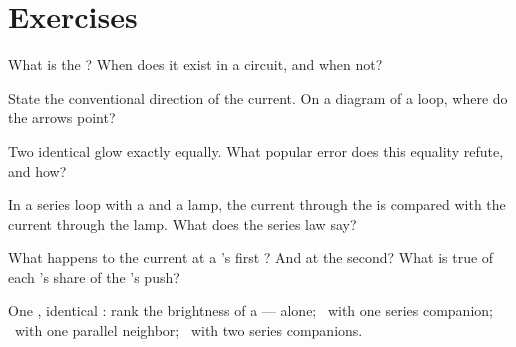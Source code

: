 \section{Exercises}

\begin{exercise}[$\star$]\label{exo:g7:circuits-series-parallel:1}
What is the ? When does it exist in a circuit,
and when not?
\end{exercise}

\begin{exercise}[$\star$]\label{exo:g7:circuits-series-parallel:2}
State the conventional direction of the current. On a diagram of
a  loop, where do the arrows point?
\end{exercise}

\begin{exercise}[$\star$]\label{exo:g7:circuits-series-parallel:3}
Two identical   glow exactly equally. What popular
error does this equality refute, and how?
\end{exercise}

\begin{exercise}[$\star$]\label{exo:g7:circuits-series-parallel:4}
In a series loop with a  and a lamp, the current through
the  is compared with the current through the lamp. What
does the series law say?
\end{exercise}

\begin{exercise}[$\star$]\label{exo:g7:circuits-series-parallel:5}
What happens to the current at a 's first
? And at the second? What is true of each 's share
of the 's push?
\end{exercise}

\begin{exercise}[$\star$]\label{exo:g7:circuits-series-parallel:6}
One , identical : rank the brightness of a  ---
alone; \ with one series companion; \ with one parallel
neighbor; \ with two series companions.
\end{exercise}

